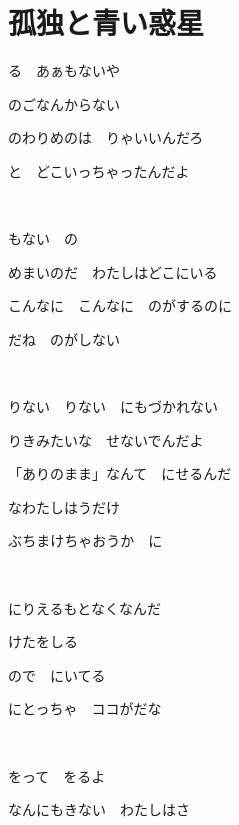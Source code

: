 \section{孤独と青い惑星}

る　あぁもないや

のごなんからない

のわりめのは　りゃいいんだろ

と　どこいっちゃったんだよ

~

もない　の

めまいのだ　わたしはどこにいる

こんなに　こんなに　のがするのに

だね　のがしない

~

りない　りない　にもづかれない

りきみたいな　せないでんだよ

「ありのまま」なんて　にせるんだ

なわたしはうだけ

ぶちまけちゃおうか　に

~

にりえるもとなくなんだ

けたをしる

\;ので　にいてる

にとっちゃ　ココがだな

~

をって　をるよ

なんにもきない　わたしはさ

